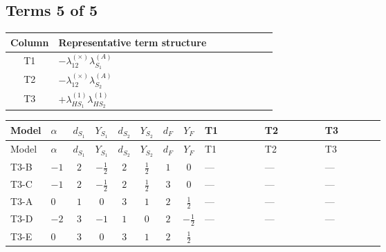 \documentclass[8pt]{article}
\begin{document}
\begin{landscape}
\subsection*{Terms 5 of 5}
\begin{center}
\begin{tabular}{@{}c >{\raggedright\arraybackslash}p{0.82\linewidth}@{}}
\toprule
Column & Representative term structure \\
\midrule
T1 & \(\displaystyle -{\lambda_{12}^{(\times)}} {\lambda_{S_1}^{(A)}}\) \\
\midrule
T2 & \(\displaystyle -{\lambda_{12}^{(\times)}} {\lambda_{S_2}^{(A)}}\) \\
\midrule
T3 & \(\displaystyle +{\lambda_{HS_1}^{(1)}} {\lambda_{HS_2}^{(1)}}\) \\
\midrule
\bottomrule
\end{tabular}
\end{center}
\smallskip
\tiny
\begin{longtable}{@{}llcccccc >{\raggedright\arraybackslash}p{0.21\linewidth} >{\raggedright\arraybackslash}p{0.21\linewidth} >{\raggedright\arraybackslash}p{0.21\linewidth}@{}}
\toprule
Model & $\alpha$ & $d_{S_1}$ & $Y_{S_1}$ & $d_{S_2}$ & $Y_{S_2}$ & $d_F$ & $Y_F$ & T1 & T2 & T3 \\
\midrule
\endfirsthead
\toprule
Model & $\alpha$ & $d_{S_1}$ & $Y_{S_1}$ & $d_{S_2}$ & $Y_{S_2}$ & $d_F$ & $Y_F$ & T1 & T2 & T3 \\
\midrule
\endhead
T3-B & $-1$ & $2$ & $-\frac{1}{2}$ & $2$ & $\frac{1}{2}$ & $1$ & $0$ & --- & --- & --- \\
\midrule
T3-C & $-1$ & $2$ & $-\frac{1}{2}$ & $2$ & $\frac{1}{2}$ & $3$ & $0$ & --- & --- & --- \\
\midrule
T3-A & $0$ & $1$ & $0$ & $3$ & $1$ & $2$ & $\frac{1}{2}$ & --- & --- & --- \\
\midrule
T3-D & $-2$ & $3$ & $-1$ & $1$ & $0$ & $2$ & $-\frac{1}{2}$ & --- & --- & --- \\
\midrule
T3-E & $0$ & $3$ & $0$ & $3$ & $1$ & $2$ & $\frac{1}{2}$ & \scriptsize\adjustbox{max width=\linewidth}{$\begin{gathered} -{\lambda_{12}^{(\times)}} {\lambda_{S_1}^{(A)}}\end{gathered}$} & \scriptsize\adjustbox{max width=\linewidth}{$\begin{gathered} -{\lambda_{12}^{(\times)}} {\lambda_{S_2}^{(A)}}\end{gathered}$} & \scriptsize\adjustbox{max width=\linewidth}{$\begin{gathered} +{\lambda_{HS_1}^{(1)}} {\lambda_{HS_2}^{(1)}}\end{gathered}$} \\
\midrule
\bottomrule
\end{longtable}
\clearpage

\end{landscape}
\end{document}
